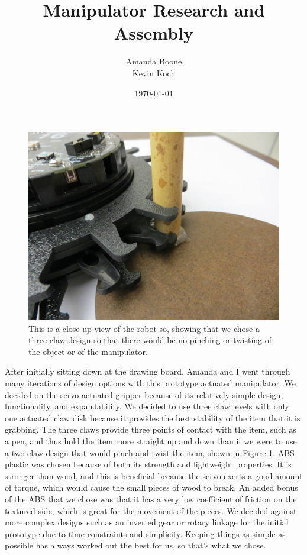 \documentclass[12pt]{article}
\title{Manipulator Research and Assembly}
\author{
        Amanda Boone\\
        Kevin Koch\\
}
\date{\today}
\begin{document}
\maketitle
\begin{figure}[h!]
\begin{center}
\includegraphics[width=5in]{Figs/close_grab.JPG} 
\caption{This is a close-up view of the robot so, showing that we chose a three claw design so that there would be no pinching or twisting of the object or of the manipulator.}
\end{center}
\label{fig:Grab}
\end{figure}

After initially sitting down at the drawing board, Amanda and I went through many iterations of design options with this prototype actuated manipulator. 
We decided on the servo-actuated gripper because of its relatively simple design, functionality, and expandability. We decided to use three claw levels with only one actuated claw disk because it provides the best stability of the item that it is grabbing. The three claws provide three points of contact with the item, such as a pen, and thus hold the item more straight up and down than if we were to use a two claw design that would pinch and twist the item, shown in Figure \ref{fig:Grab}. ABS plastic was chosen because of both its strength and lightweight properties. It is stronger than wood, and this is beneficial because the servo exerts a good amount of torque, which would cause the small pieces of wood to break. An added bonus of the ABS that we chose was that it has a very low coefficient of friction on the textured side, which is great for the movement of the pieces.
We decided against more complex designs such as an inverted gear or rotary linkage for the initial prototype due to time constraints and simplicity. Keeping things as simple as possible has always worked out the best for us, so that's what we chose. 
\end{document}
